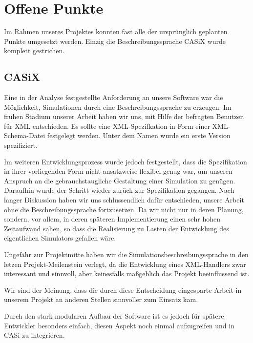 
\section{Offene Punkte}\label{sec:conc_open_questions}
Im Rahmen unseres Projektes konnten fast alle der ursprünglich geplanten Punkte umgesetzt werden. Einzig die Beschreibungssprache CASiX wurde komplett gestrichen.

\subsection{CASiX}\label{subsec:conc_open_questions_casix}
Eine in der Analyse festgestellte Anforderung an unsere Software war die Möglichkeit, Simulationen durch eine Beschreibungssprache zu erzeugen. Im frühen Stadium unserer Arbeit haben wir uns, mit Hilfe der befragten Benutzer, für XML entschieden. Es sollte eine XML-Spezifkation in Form einer XML-Schema-Datei festgelegt werden. Unter dem Namen  wurde ein erste Version spezifiziert.

Im weiteren Entwicklungsprozess wurde jedoch festgestellt, dass die Spezifikation in ihrer vorliegenden Form nicht ansatzweise flexibel genug war, um unseren Anspruch an die gebrauchstaugliche Gestaltung einer Simulation zu genügen. Daraufhin wurde der Schritt wieder zurück zur Spezifikation gegangen. Nach langer Diskussion haben wir uns schlussendlich dafür entschieden, unsere Arbeit ohne die Beschreibungssprache fortzusetzen. Da wir nicht nur in deren Planung, sondern, vor allem, in deren späteren Implementierung einen sehr hohen Zeitaufwand sahen, so dass die Realisierung zu Lasten der Entwicklung des eigentlichen Simulators gefallen wäre.

Ungefähr zur Projektmitte haben wir die Simulations\-beschreibungs\-sprache in den letzen Projekt-Meilenstein verlegt, da die Entwicklung eines XML-Handlers zwar interessant und sinnvoll, aber keinesfalls maßgeblich das Projekt beeinflussend ist. 

Wir sind der Meinung, dass die durch diese Entscheidung eingesparte Arbeit in unserem Projekt an anderen Stellen sinnvoller zum Einsatz kam.

Durch den stark modularen Aufbau der Software ist es jedoch für spätere Entwickler besonders einfach, diesen Aspekt noch einmal aufzugreifen und in CASi zu integrieren.

